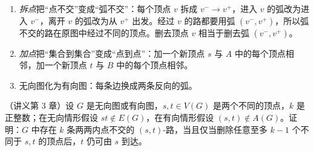 
\begin{enumerate}
\item \emph{拆点}把“点不交”变成“弧不交”：每个顶点 $v$ 拆成 $v^-\to v^+$，进入 $v$ 的弧改为进入 $v^-$，离开 $v$ 的弧改为从 $v^+$ 出发。经过 $v$ 的路都要用弧 $(v^-,v^+)$，所以弧不交的路在原图中经过不同的顶点。删去顶点 $v$ 相当于删去弧 $(v^-,v^+)$。
\item \emph{加点}把“集合到集合”变成“点到点”：加一个新顶点 $s$ 与 $A$ 中的每个顶点相邻，加一个新顶点 $t$ 与 $B$ 中的每个顶点相邻。
\item 无向图化为有向图：每条边换成两条反向的弧。
\end{enumerate}

\begin{workedexample}[问题 3]\label{we:yan-ch3-problems:vertex-menger}
（讲义第 3 章）设 $G$ 是无向图或有向图，$s,t\in V(G)$ 是两个不同的顶点，$k$ 是正整数；在无向情形假设 $st\notin E(G)$，在有向情形假设 $(s,t)\notin A(G)$。证明：$G$ 中存在 $k$ 条两两内点不交的 $(s,t)$-路，当且仅当删除任意至多 $k-1$ 个不同于 $s,t$ 的顶点后，$t$ 仍可由 $s$ 到达。
\end{workedexample}
